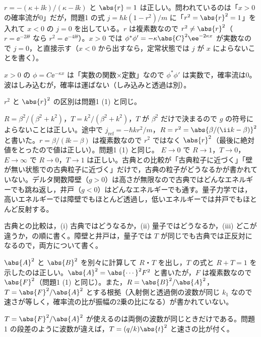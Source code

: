 \begin{kotaeran}
   $r=-(\kappa+\ii k)/(\kappa-\ii k)$ と $\abs{r}=1$ は正しい。問われているのは「$x>0$ の確率流が0」だが，問題1 の式 $j=\hbar k(1-r^{2})/m$ に「$r^{2}=\abs{r}^{2}=1$」を入れて $x<0$ の $j=0$ を出している。$r$ は複素数なので $r^{2}\ne\abs{r}^{2}$（$r=\ee^{-2\ii\theta}$ なら $r^{2}=\ee^{-4\ii\theta}$）。$x>0$ では $\phi^{*}\phi'=-\kappa\abs{C}^{2}\ee^{-2\kappa x}$ が実数なので $j=0$，と直接示す（$x<0$ から出すなら，定常状態では $j$ が $x$ によらないことを書く）。
\end{kotaeran}
\begin{rikai}
  \item $x>0$ の $\phi=C\ee^{-\kappa x}$ は「実数の関数×定数」なので $\phi^{*}\phi'$ は実数で，確率流は0。波はしみ込むが，確率は運ばない（しみ込みと透過は別）。
  \item $r^{2}$ と $\abs{r}^{2}$ の区別は問題1 (1) と同じ。
\end{rikai}
\begin{kotaeran}
   $R=\beta^{2}/(\beta^{2}+k^{2})$，$T=k^{2}/(\beta^{2}+k^{2})$，$T$ が $\beta^{2}$ だけで決まるので $g$ の符号によらないことは正しい。途中で $j_{\mathrm{ref}}=-\hbar k r^{2}/m$，$R=r^{2}=\abs{\beta/(\ii k-\beta)}^{2}$ と書いた。$r=\beta/(\ii k-\beta)$ は複素数なので $r^{2}$ ではなく $\abs{r}^{2}$（最後に絶対値をとったので値は正しい）。問題1 (1) と同じ。
   $E\to0$ で $R\to1$，$T\to0$，$E\to\infty$ で $R\to0$，$T\to1$ は正しい。古典との比較が「古典粒子に近づく」「壁が無い状態での古典粒子に近づく」だけで，古典の粒子がどうなるかが書かれていない。デルタ関数障壁（$g>0$）は高さが無限なので古典ではどんなエネルギーでも跳ね返し，井戸（$g<0$）はどんなエネルギーでも通す。量子力学では，高いエネルギーでは障壁でもほとんど透過し，低いエネルギーでは井戸でもほとんど反射する。
\end{kotaeran}
\begin{rikai}
  \item 古典との比較は，(i) 古典ではどうなるか，(ii) 量子ではどうなるか，(iii) どこが違うか，の順に書く。障壁と井戸は，量子では $T$ が同じでも古典では正反対になるので，両方について書く。
\end{rikai}
\begin{kotaeran}
   $\abs{A}^{2}$ と $\abs{B}^{2}$ を別々に計算して $R$・$T$ を出し，$T$ の式と $R+T=1$ を示したのは正しい。$\abs{A}^{2}=\abs{\cdots}^{2}F^{2}$ と書いたが，$F$ は複素数なので $\abs{F}^{2}$（問題1 (1) と同じ）。また，$R=\abs{B}^{2}/\abs{A}^{2}$，$T=\abs{F}^{2}/\abs{A}^{2}$ とする根拠（入射側と透過側の波数が同じ $k_{1}$ なので速さが等しく，確率流の比が振幅の2乗の比になる）が書かれていない。
\end{kotaeran}
\begin{rikai}
  \item $T=\abs{F}^{2}/\abs{A}^{2}$ が使えるのは両側の波数が同じときだけである。問題1 の段差のように波数が違えば，$T=(q/k)\abs{t}^{2}$ と速さの比が付く。
\end{rikai}
